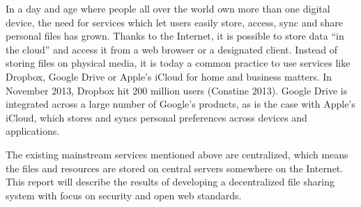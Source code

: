 In a day and age where people all over the world own more than one digital device, the need for services which let users easily store, access, sync and share personal files has grown. Thanks to the Internet, it is possible to store data “in the cloud” and access it from a web browser or a designated client. Instead of storing files on physical media, it is today a common practice to use services like Dropbox, Google Drive or Apple’s iCloud for home and business matters. In November 2013, Dropbox hit 200 million users (Constine 2013). Google Drive is integrated across a large number of Google’s products, as is the case with Apple’s iCloud, which stores and syncs personal preferences across devices and applications.

The existing mainstream services mentioned above are centralized, which means the files and resources are stored on central servers somewhere on the Internet. This report will describe the results of developing a decentralized file sharing system with focus on security and open web standards.





